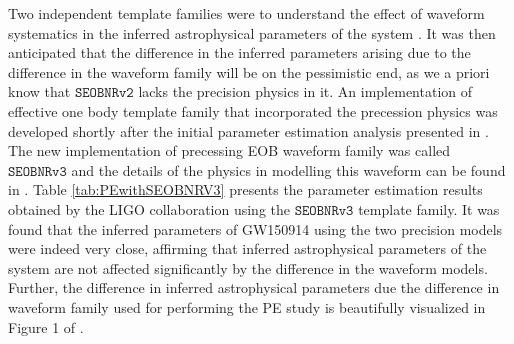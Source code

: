  


Two independent template families were to understand the effect of waveform systematics in the inferred astrophysical parameters of the system \cite{gw150914PE}. It was then anticipated that the difference in the inferred parameters arising due to the difference in the waveform family will be on the pessimistic end, as we a priori know that $\texttt{SEOBNRv2}$ lacks the precision physics in it. An implementation of effective one body template family that incorporated the precession physics was developed shortly after the initial parameter estimation analysis presented in \cite{gw150914PEseobnrv3}. The new implementation of precessing EOB waveform family was called $\texttt{SEOBNRv3}$  and the details of the physics in modelling this waveform can be found in \cite{SEOBNRv3}. Table \ref{tab:PEwithSEOBNRV3} presents the parameter estimation results obtained by the LIGO collaboration using the $\texttt{SEOBNRv3}$ template family. It was found that the inferred parameters of GW150914 using the two precision models were indeed very close, affirming that inferred astrophysical parameters of the system are not affected significantly by the difference in the waveform models. Further, the difference in inferred astrophysical parameters due the difference in waveform family used for performing the PE study is beautifully visualized in Figure 1 of \cite{gw150914PEseobnrv3}. 





